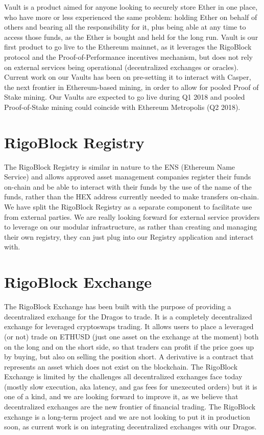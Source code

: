 \documentclass[9pt,oneside]{amsart}
\begin{document}
\begin{multicols}{2}
Vault is a product aimed for anyone looking to securely store Ether in one place, who have more or less experienced the same problem: holding Ether on behalf of others and bearing all the responsibility for it, plus being able at any time to access those funds, as the Ether is bought and held for the long run.
Vault is our first product to go live to the Ethereum mainnet, as it leverages the RigoBlock protocol and the Proof-of-Performance incentives mechanism, but does not rely on external services being operational (decentralized exchanges or oracles). Current work on our Vaults has been on pre-setting it to interact with Casper, the next frontier in Ethereum-based mining, in order to allow for pooled Proof of Stake mining. Our Vaults are expected to go live during Q1 2018 and pooled Proof-of-Stake mining could coincide with Ethereum Metropolis (Q2 2018).

\section{RigoBlock Registry}
The RigoBlock Registry is similar in nature to the ENS (Ethereum Name Service) and allows approved asset management companies register their funds on-chain and be able to interact with their funds by the use of the name of the funds, rather than the HEX address currently needed to make transfers on-chain. We have split the RigoBlock Registry as a separate component to facilitate use from external parties. We are really looking forward for external service providers to leverage on our modular infrastructure, as rather than creating and managing their own registry, they can just plug into our Registry application and interact with.

\section{RigoBlock Exchange}
The RigoBlock Exchange has been built with the purpose of providing a decentralized exchange for the Dragos to trade. It is a completely decentralized exchange for leveraged cryptoswaps trading. It allows users to place a leveraged (or not) trade on ETHUSD (just one asset on the exchange at the moment) both on the long and on the short side, so that traders can profit if the price goes up by buying, but also on selling the position short. A derivative is a contract that represents an asset which does not exist on the blockchain.
The RigoBlock Exchange is limited by the challenges all decentralized exchanges face today (mostly slow execution, aka latency, and gas fees for unexecuted orders) but it is one of a kind, and we are looking forward to improve it, as we believe that decentralized exchanges are the new frontier of financial trading. The RigoBlock exchange is a long-term project and we are not looking to put it in production soon, as current work is on integrating decentralized exchanges with our Dragos.


\end{multicols}
\end{document}
